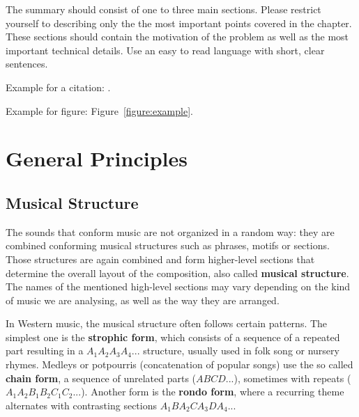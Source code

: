 \documentclass[a4paper, 9pt, twocolumn]{extarticle}
\begin{document}
The summary should consist of one to three main sections.
Please restrict yourself to describing only the the most
important points covered in the chapter. These sections
should contain the motivation of the problem as well as
the most important technical details. Use an easy to read
language with short, clear sentences. 


Example for a citation: \cite{Mueller07_InformationRetrieval_SPRINGER}.

Example for figure: Figure~\ref{figure:example}.

\newpage


\newpage

\section{General Principles} 
\label{section:generalPrinciples}

\subsection{Musical Structure}  
The sounds that conform music are not organized in a random way: they are combined conforming musical structures such as phrases, motifs or sections. Those structures are again combined and form higher-level sections that determine the overall layout of the composition, also called \textbf{musical structure}. The names of the mentioned high-level sections may vary depending on the kind of music we are analysing, as well as the way they are arranged. 

\medskip

In Western music, the musical structure often follows certain patterns. The simplest one is the \textbf{strophic form}, which consists of a sequence of a repeated part resulting in a $A_{1}A_{2}A_{3}A_{4}...$ structure, usually used in folk song or nursery rhymes. Medleys or potpourris (concatenation of popular songs) use the so called \textbf{chain form}, a sequence of unrelated parts ($ABCD...$), sometimes with repeats ($A_{1}A_{2}B_{1}B_{2}C_{1}C_{2}...$). Another form is the \textbf{rondo form}, where a recurring theme alternates with contrasting sections $A_{1}BA_{2}CA_{3}DA_{4}...$
\end{document}

